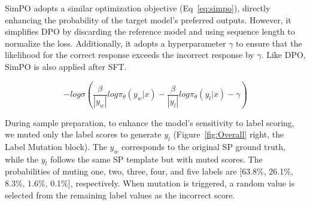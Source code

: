 \documentclass[11pt]{article}
\begin{document}

SimPO adopts a similar optimization objective (Eq~\ref{eq:simpo}), directly enhancing the probability of the target model’s preferred outputs. However, it simplifies DPO by discarding the reference model and using sequence length to normalize the loss. Additionally, it adopts a hyperparameter $\gamma$ to ensure that the likelihood for the correct response exceeds the incorrect response by $\gamma$. Like DPO, SimPO is also applied after SFT.

\begin{equation}
\label{eq:simpo}
-log\sigma (\frac{\beta}{|y_w|}log\pi_{\theta} (y_w|x) - \frac{\beta}{|y_l|}log\pi_{\theta} (y_l|x) - \gamma)
\end{equation}

 
 During sample preparation, to enhance the model's sensitivity to label scoring, we muted only the label scores to generate $y_l$ (Figure~\ref{fig:Overall} right, the Label Mutation block). The $y_w$ corresponds to the original SP ground truth, while the $y_l$ follows the same SP template but with muted scores. The probabilities of muting one, two, three, four, and five labels are [63.8\%, 26.1\%, 8.3\%, 1.6\%, 0.1\%], respectively. When mutation is triggered, a random value is selected from the remaining label values as the incorrect score.
 
\end{document}
